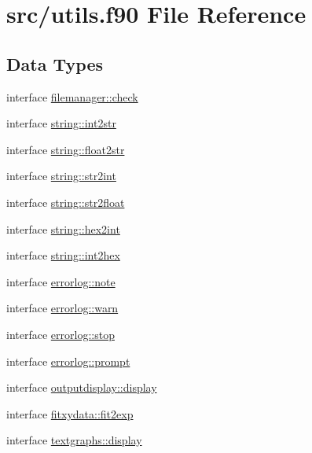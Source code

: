 \hypertarget{utils_8f90}{}\section{src/utils.f90 File Reference}
\label{utils_8f90}
\subsection*{Data Types}
\begin{DoxyCompactItemize}
\item 
interface \hyperlink{interfacefilemanager_1_1check}{filemanager\+::check}
\item 
interface \hyperlink{interfacestring_1_1int2str}{string\+::int2str}
\item 
interface \hyperlink{interfacestring_1_1float2str}{string\+::float2str}
\item 
interface \hyperlink{interfacestring_1_1str2int}{string\+::str2int}
\item 
interface \hyperlink{interfacestring_1_1str2float}{string\+::str2float}
\item 
interface \hyperlink{interfacestring_1_1hex2int}{string\+::hex2int}
\item 
interface \hyperlink{interfacestring_1_1int2hex}{string\+::int2hex}
\item 
interface \hyperlink{interfaceerrorlog_1_1note}{errorlog\+::note}
\item 
interface \hyperlink{interfaceerrorlog_1_1warn}{errorlog\+::warn}
\item 
interface \hyperlink{interfaceerrorlog_1_1stop}{errorlog\+::stop}
\item 
interface \hyperlink{interfaceerrorlog_1_1prompt}{errorlog\+::prompt}
\item 
interface \hyperlink{interfaceoutputdisplay_1_1display}{outputdisplay\+::display}
\item 
interface \hyperlink{interfacefitxydata_1_1fit2exp}{fitxydata\+::fit2exp}
\item 
interface \hyperlink{interfacetextgraphs_1_1display}{textgraphs\+::display}
\end{DoxyCompactItemize}
